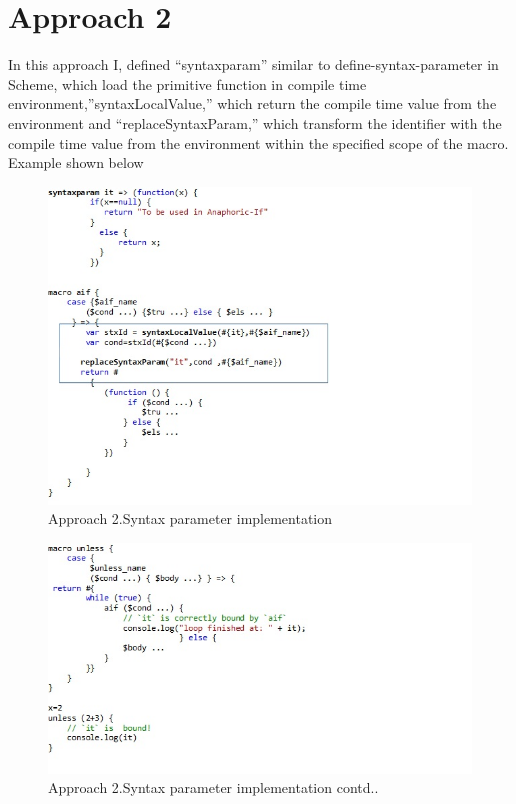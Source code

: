 \newpage
\section{Approach 2}

In this approach I, defined ``syntaxparam'' similar to define-syntax-parameter in Scheme, which load the primitive function in compile time environment,''syntaxLocalValue,'' which return the compile time value from the environment and ``replaceSyntaxParam,'' which transform the identifier with the compile time value from the environment within the specified scope of the macro. Example shown below

\begin{figure}[htb]
\centering
\includegraphics[width=1.0\textwidth]{images/Appraoch21.jpg}
\caption{ Approach 2.Syntax parameter implementation} 
\label{fig:AST}
\end{figure}

\begin{figure}[htb]
\centering
\includegraphics[width=1.0\textwidth]{images/Appraoch23.jpg}
\caption{ Approach 2.Syntax parameter implementation contd..} 
\label{fig:AST}
\end{figure}
 
